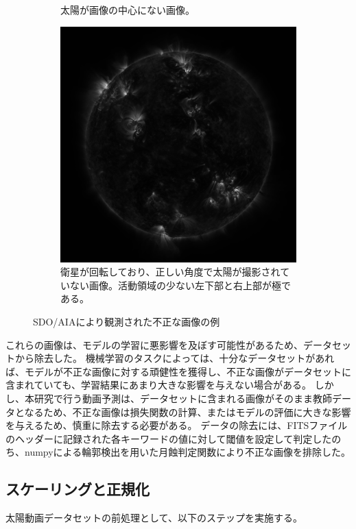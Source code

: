 \begin{figure}[htbp]
\begin{subfigure}[b]{0.48\textwidth}
        \caption{太陽が画像の中心にない画像。}
    \end {subfigure}
    \begin{subfigure}[b]{0.48\textwidth}
        \includegraphics[width=\textwidth]{figures/bad_sample2.jpg}
        \caption{衛星が回転しており、正しい角度で太陽が撮影されていない画像。活動領域の少ない左下部と右上部が極である。}
    \end {subfigure}
    \hfill
    \caption{SDO/AIAにより観測された不正な画像の例}
    \label{fig:bad_aia_samples}
\end{figure}

これらの画像は、モデルの学習に悪影響を及ぼす可能性があるため、データセットから除去した。
機械学習のタスクによっては、十分なデータセットがあれば、モデルが不正な画像に対する頑健性を獲得し、不正な画像がデータセットに含まれていても、学習結果にあまり大きな影響を与えない場合がある。
しかし、本研究で行う動画予測は、データセットに含まれる画像がそのまま教師データとなるため、不正な画像は損失関数の計算、またはモデルの評価に大きな影響を与えるため、慎重に除去する必要がある。
データの除去には、FITSファイルのヘッダーに記録された各キーワードの値に対して閾値を設定して判定したのち、numpyによる輪郭検出を用いた月蝕判定関数により不正な画像を排除した。

\subsection{スケーリングと正規化}
太陽動画データセットの前処理として、以下のステップを実施する。

